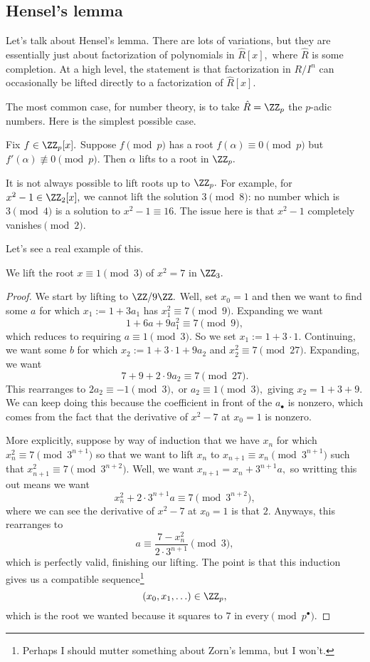 \documentclass[../notes.tex]{subfiles}
\begin{document}
\subsection{Hensel's lemma}
Let's talk about {Hensel}'s lemma. There are lots of variations, but they are essentially just about factorization of polynomials in $\hat R[x],$ where $\hat R$ is some completion. At a high level, the statement is that factorization in $R/I^n$ can occasionally be lifted directly to a factorization of $\hat R[x].$

The most common case, for number theory, is to take $\hat R=\ZZ_p$ the $p$-adic numbers. Here is the simplest possible case.
\begin{theorem}[Hensel] \label{thm:hensel1}
	Fix $f\in\ZZ_p[x].$ Suppose $f\pmod p$ has a root $f(\alpha)\equiv0\pmod p$ but $f'(\alpha)\not\equiv0\pmod p.$ Then $\alpha$ lifts to a root in $\ZZ_p.$
\end{theorem}
\begin{nex}
	It is not always possible to lift roots up to $\ZZ_p.$ For example, for $x^2-1\in\ZZ_2[x],$ we cannot lift the solution $3\pmod8$: no number which is $3\pmod4$ is a solution to $x^2-1\equiv{16}.$ The issue here is that $x^2-1$ completely vanishes$\pmod2.$
\end{nex}
Let's see a real example of this.
\begin{exercise}
	We lift the root $x\equiv1\pmod3$ of $x^2=7$ in $\ZZ_3.$
\end{exercise}
\begin{proof}
	We start by lifting to $\ZZ/9\ZZ.$ Well, set $x_0=1$ and then we want to find some $a$ for which $x_1:=1+3a_1$ has $x_1^2\equiv7\pmod9.$ Expanding we want
	\[1+6a+9a_1^2\equiv7\pmod9,\]
	which reduces to requiring $a\equiv1\pmod3.$ So we set $x_1:=1+3\cdot1.$ Continuing, we want some $b$ for which $x_2:=1+3\cdot1+9a_2$ and $x_2^2\equiv7\pmod{27}.$ Expanding, we want
	\[7+9+2\cdot9a_2\equiv7\pmod{27}.\]
	This rearranges to $2a_2\equiv-1\pmod3,$ or $a_2\equiv1\pmod3,$ giving $x_2=1+3+9.$ We can keep doing this because the coefficient in front of the $a_\bullet$ is nonzero, which comes from the fact that the derivative of $x^2-7$ at $x_0=1$ is nonzero.

	More explicitly, suppose by way of induction that we have $x_n$ for which $x_n^2\equiv7\pmod{3^{n+1}}$ so that we want to lift $x_n$ to $x_{n+1}\equiv x_n\pmod{3^{n+1}}$ such that $x_{n+1}^2\equiv7\pmod{3^{n+2}}.$ Well, we want $x_{n+1}=x_n+3^{n+1}a,$ so writting this out means we want
	\[x_n^2+2\cdot3^{n+1}a\equiv7\pmod{3^{n+2}},\]
	where we can see the derivative of $x^2-7$ at $x_0=1$ is that $2.$ Anyways, this rearranges to
	\[a\equiv\frac{7-x_n^2}{2\cdot3^{n+1}}\pmod3,\]
	which is perfectly valid, finishing our lifting. The point is that this induction gives us a compatible sequence\footnote{Perhaps I should mutter something about Zorn's lemma, but I won't.}
	\[(x_0,x_1,\ldots)\in\ZZ_p,\]
	which is the root we wanted because it squares to $7$ in every$\pmod{p^\bullet}.$
\end{proof}
\end{document}
